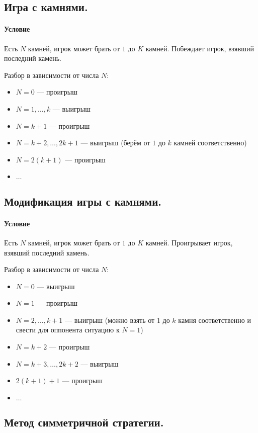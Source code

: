 \subsection{Игра с камнями.}
\paragraph{Условие} Есть $N$ камней, игрок может брать от $1$ до $K$ камней. Побеждает игрок,
взявший последний камень.

Разбор в зависимости от числа $N$:
\begin{itemize}
  \item $N = 0$ --- проигрыш 
  \item $N = 1, \ldots, k$ --- выигрыш
  \item $N = k + 1$ --- проигрыш
  \item $N = k + 2, \ldots, 2k + 1$ --- выигрыш (берём от $1$ до $k$ камней соответственно)
  \item $N = 2(k + 1)$ --- проигрыш
  \item $\ldots$
\end{itemize}

\subsection{Модификация игры с камнями.}
\paragraph{Условие} Есть $N$ камней, игрок может брать от $1$ до $K$ камней. Проигрывает игрок,
взявший последний камень.

Разбор в зависимости от числа $N$:
\begin{itemize}
  \item $N = 0$ --- выигрыш
  \item $N = 1$ --- проигрыш
  \item $N = 2, \ldots, k + 1$ --- выигрыш (можно взять от $1$ до $k$ камня соответственно и свести для
    оппонента ситуацию к $N = 1$)
  \item $N = k + 2$ --- проигрыш
  \item $N = k + 3, \ldots, 2k + 2$ --- выигрыш
  \item $2(k + 1) + 1$ --- проигрыш
  \item $\ldots$
\end{itemize}

\subsection{Метод симметричной стратегии.}
